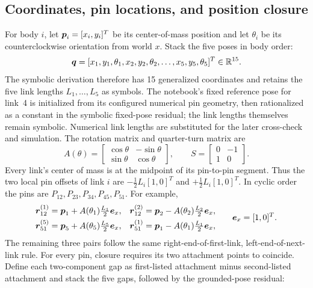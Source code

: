 \documentclass[../main.tex]{subfiles}
\begin{document}
	\subsection{Coordinates, pin locations, and position closure}

	For body $i$, let $\boldsymbol{p}_i=[x_i,y_i]^T$ be its center-of-mass position and let $\theta_i$ be its counterclockwise orientation from world $x$. Stack the five poses in body order:
	\begin{equation}
	\boldsymbol{q}=[x_1,y_1,\theta_1,x_2,y_2,\theta_2,\ldots,x_5,y_5,\theta_5]^T\in\mathbb R^{15}.
	\label{eq:five-link-q-ch4}
	\end{equation}
	The symbolic derivation therefore has 15 generalized coordinates and retains the five link lengths $L_1,\ldots,L_5$ as symbols. The notebook's fixed reference pose for link~4 is initialized from its configured numerical pin geometry, then rationalized as a constant in the symbolic fixed-pose residual; the link lengths themselves remain symbolic. Numerical link lengths are substituted for the later cross-check and simulation.
	The rotation matrix and quarter-turn matrix are
	\begin{equation}
	A(\theta)=\begin{bmatrix}\cos\theta&-\sin\theta\\\sin\theta&\cos\theta\end{bmatrix},
	\qquad
	S=\begin{bmatrix}0&-1\\1&0\end{bmatrix}.
	\label{eq:five-link-rotation-ch4}
	\end{equation}
	Every link's center of mass is at the midpoint of its pin-to-pin segment. Thus the two local pin offsets of link $i$ are $-\tfrac12L_i[1,0]^T$ and $+\tfrac12L_i[1,0]^T$. In cyclic order the pins are $P_{12},P_{23},P_{34},P_{45},P_{51}$. For example,
	\begin{equation}
	\begin{aligned}
	\boldsymbol{r}_{12}^{(1)}&=\boldsymbol{p}_1+A(\theta_1)\tfrac{L_1}{2}\boldsymbol{e}_x,
	&\boldsymbol{r}_{12}^{(2)}&=\boldsymbol{p}_2-A(\theta_2)\tfrac{L_2}{2}\boldsymbol{e}_x,\\
	\boldsymbol{r}_{51}^{(5)}&=\boldsymbol{p}_5+A(\theta_5)\tfrac{L_5}{2}\boldsymbol{e}_x,
	&\boldsymbol{r}_{51}^{(1)}&=\boldsymbol{p}_1-A(\theta_1)\tfrac{L_1}{2}\boldsymbol{e}_x,
	\end{aligned}
	\qquad \boldsymbol{e}_x=[1,0]^T.
	\label{eq:five-link-pin-examples-ch4}
	\end{equation}
	The remaining three pairs follow the same right-end-of-first-link, left-end-of-next-link rule. For every pin, closure requires its two attachment points to coincide. Define each two-component gap as first-listed attachment minus second-listed attachment and stack the five gaps, followed by the grounded-pose residual:
\end{document}
